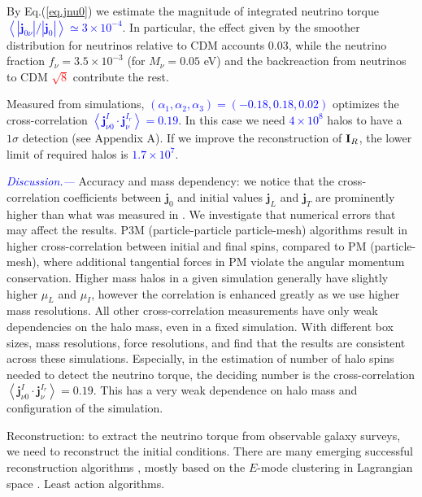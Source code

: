 \documentclass[aps,prd,twocolumn,amsmath,amssymb,amsfont,superscriptaddress]{revtex4-1}
\newcommand{\bs}{\boldsymbol}
\newcommand{\tcb}{\textcolor{blue}}
\newcommand{\tcr}{\textcolor{red}}
\begin{document}
By Eq.(\ref{eq.jnu0}) we estimate the magnitude of integrated neutrino torque \tcb{$\left\langle|\bs{j}_{0\nu}|/|\bs{j}_0|\right\rangle\simeq 3\times10^{-4}$}. In particular, the effect given by the smoother distribution for neutrinos relative to CDM accounts 0.03, while the neutrino fraction $f_\nu=3.5\times 10^{-3}$ (for $M_\nu=0.05$ eV) and the backreaction from neutrinos to CDM \tcr{$\sqrt{8}$} contribute the rest.

Measured from simulations, \tcb{$(\alpha_1,\alpha_2,\alpha_3)=(-0.18,0.18,0.02)$} optimizes the cross-correlation \tcb{$\left\langle\bs{j}^I_{\nu 0}\cdot\bs{j}^{I_r}_\nu\right\rangle=0.19$}. In this case we need \tcb{$4\times 10^8$} halos to have a $1\sigma$ detection (see Appendix A). If we improve the reconstruction of $\bold{I}_R$, the lower limit of required halos is \tcb{$1.7\times 10^7$}. 

\tcb{\textit{Discussion.---}} 
Accuracy and mass dependency: we notice that the cross-correlation coefficients between $\bs{j}_0$ and initial values $\bs{j}_L$ and $\bs{j}_T$ are prominently higher than what was measured in \citep{2000ApJ...532L...5L}. We investigate that numerical errors that may affect the results. P3M (particle-particle particle-mesh) algorithms result in higher cross-correlation between initial and final spins, compared to PM (particle-mesh), where additional tangential forces in PM violate the angular momentum conservation. Higher mass halos in a given simulation generally have slightly higher $\mu_L$ and $\mu_I$, however the correlation is enhanced greatly as we use higher mass resolutions. All other cross-correlation measurements have only weak dependencies on the halo mass, even in a fixed simulation. With different box sizes, mass resolutions, force resolutions, and find that the results are consistent across these simulations. Especially, in the estimation of number of halo spins needed to detect the neutrino torque, the deciding number is the cross-correlation $\left\langle\bs{j}^I_{\nu 0}\cdot\bs{j}^{I_r}_\nu\right\rangle=0.19$. This has a very weak dependence on halo mass and configuration of the simulation.

Reconstruction: to extract the neutrino torque from observable galaxy surveys, we need to reconstruct the initial conditions. There are many emerging successful reconstruction algorithms \citep{2017PhRvD..96l3502Z,2017ApJ...847..110Y,2014ApJ...794...94W}, mostly based on the $E$-mode clustering in Lagrangian space \citep{2017PhRvD..95d3501Y}. Least action algorithms.
\end{document}
